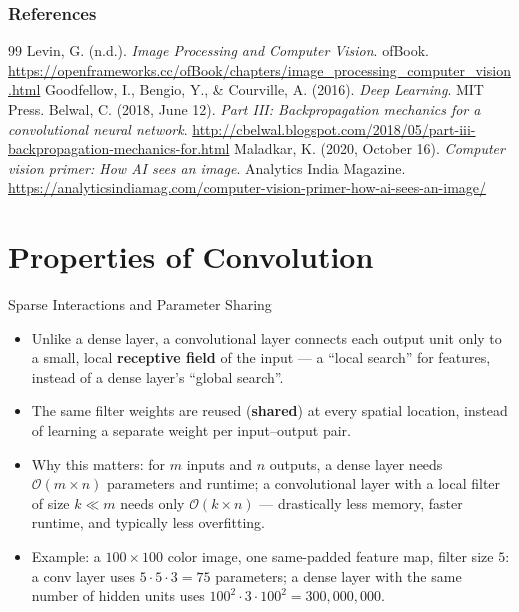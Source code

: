 \begin{vbframe}
\frametitle{References}
\footnotesize{
\begin{thebibliography}{99}
 Levin, G. (n.d.). \textit{Image Processing and Computer Vision}. ofBook. \url{https://openframeworks.cc/ofBook/chapters/image_processing_computer_vision.html}
 Goodfellow, I., Bengio, Y., \& Courville, A. (2016). \textit{Deep Learning}. MIT Press.
 Belwal, C. (2018, June 12). \textit{Part III: Backpropagation mechanics for a convolutional neural network}. \url{http://cbelwal.blogspot.com/2018/05/part-iii-backpropagation-mechanics-for.html}
 Maladkar, K. (2020, October 16). \textit{Computer vision primer: How AI sees an image}. Analytics India Magazine. \url{https://analyticsindiamag.com/computer-vision-primer-how-ai-sees-an-image/}
\end{thebibliography}
}
\end{vbframe}

\section{Properties of Convolution}

\begin{vbframe}{Sparse Interactions and Parameter Sharing}
  \begin{itemize}
    \item Unlike a dense layer, a convolutional layer connects each output unit only to a small, local \textbf{receptive field} of the input --- a \enquote{local search} for features, instead of a dense layer's \enquote{global search}.
    \item The same filter weights are reused (\textbf{shared}) at every spatial location, instead of learning a separate weight per input--output pair.
    \item Why this matters: for $m$ inputs and $n$ outputs, a dense layer needs $\mathcal{O}(m \times n)$ parameters and runtime; a convolutional layer with a local filter of size $k \ll m$ needs only $\mathcal{O}(k \times n)$ --- drastically less memory, faster runtime, and typically less overfitting.
    \item Example: a $100\times 100$ color image, one same-padded feature map, filter size $5$: a conv layer uses $5\cdot 5\cdot 3 = 75$ parameters; a dense layer with the same number of hidden units uses $100^2 \cdot 3 \cdot 100^2 = 300{,}000{,}000$.
  \end{itemize}
\end{vbframe}

